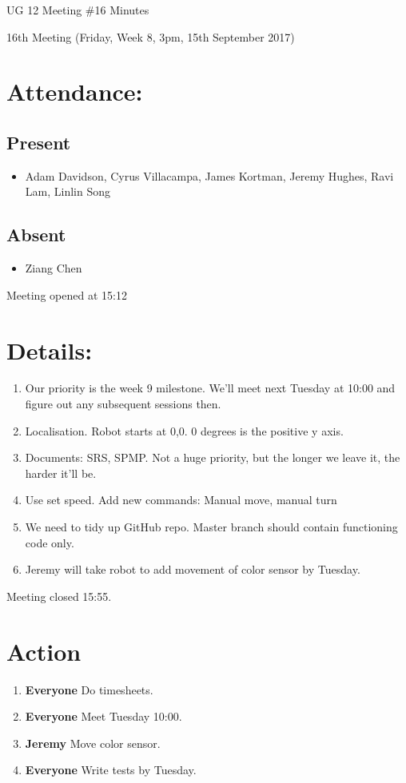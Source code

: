 \documentclass{article}
\begin{document}
\begin{adjustwidth}{2.5em}{0pt}
\begin{center}
\Large{UG 12 Meeting \#16 Minutes}\\
\end{center}
\end{adjustwidth}


16th Meeting (Friday, Week 8, 3pm, 15th September 2017)
\section{Attendance:}
\subsection*{Present}
\begin{itemize}
\item Adam Davidson, Cyrus Villacampa, James Kortman, Jeremy Hughes, Ravi Lam, Linlin Song
\end{itemize}
\subsection*{Absent}
\begin{itemize}
\item Ziang Chen
\end {itemize}

Meeting opened at 15:12
\section{Details:}
\begin{enumerate}
\item Our priority is the week 9 milestone. We'll meet next Tuesday at 10:00 and figure out any subsequent sessions then.
\item Localisation. Robot starts at 0,0. 0 degrees is the positive y axis.
\item Documents: SRS, SPMP. Not a huge priority, but the longer we leave it, the harder it’ll be.
\item Use set speed. Add new commands: Manual move, manual turn
\item We need to tidy up GitHub repo. Master branch should contain functioning code only.
\item Jeremy will take robot to add movement of color sensor by Tuesday.

\end{enumerate}

Meeting closed 15:55.

\section{Action}
\begin{enumerate}
\item \textbf{Everyone} Do timesheets.
\item \textbf{Everyone} Meet Tuesday 10:00.
\item \textbf{Jeremy} Move color sensor.
\item \textbf{Everyone} Write tests by Tuesday.
\end{enumerate}
\end{document}
